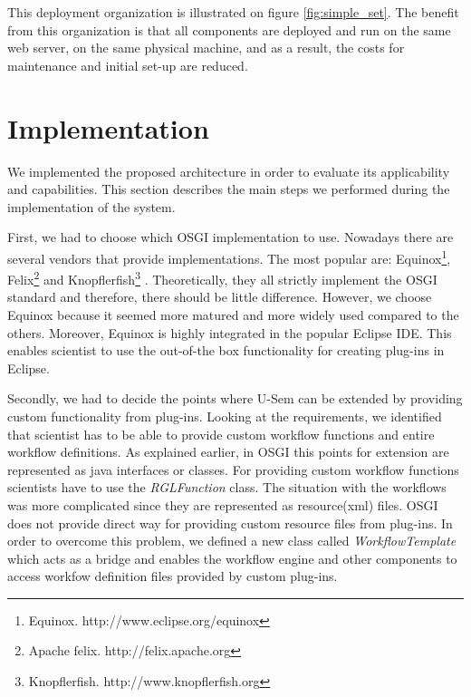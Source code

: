 This deployment organization is illustrated on figure \ref{fig:simple_set}. The benefit from this organization is that all components are deployed and run on the same web server, on the same physical machine, and as a result, the costs for maintenance and initial set-up are reduced.

\section{Implementation}
\label{sec:implPlugin}

We implemented the proposed architecture in order to evaluate its applicability and capabilities. This section describes the main steps we performed during the implementation of the system.

First, we had to choose which OSGI implementation to use. Nowadays there are several vendors that provide implementations. The most popular are: Equinox\footnote{Equinox. http://www.eclipse.org/equinox}, Felix\footnote{Apache felix. http://felix.apache.org} and Knopflerfish\footnote{Knopflerfish. http://www.knopflerfish.org} \cite{tavares2008gentle}. Theoretically, they all strictly implement the OSGI standard and therefore, there should be little difference. However, we choose Equinox because it seemed more matured and more widely used compared to the others. Moreover, Equinox is highly integrated in the popular Eclipse IDE. This enables scientist to use the out-of-the box functionality for creating plug-ins in Eclipse.

Secondly, we had to decide the points where U-Sem can be extended by providing custom functionality from plug-ins. Looking at the requirements, we identified that scientist has to be able to provide custom workflow functions and entire workflow definitions. As explained earlier, in OSGI this points for extension are represented as java interfaces or classes. For providing custom workflow functions scientists have to use the \textit{RGLFunction} class. The situation with the workflows was more complicated since they are represented as resource(xml) files. OSGI does not provide direct way for providing custom resource files from plug-ins. In order to overcome this problem, we defined a new class called \textit{WorkflowTemplate} which acts as a bridge and enables the workflow engine and other components to access workfow definition files provided by custom plug-ins.

